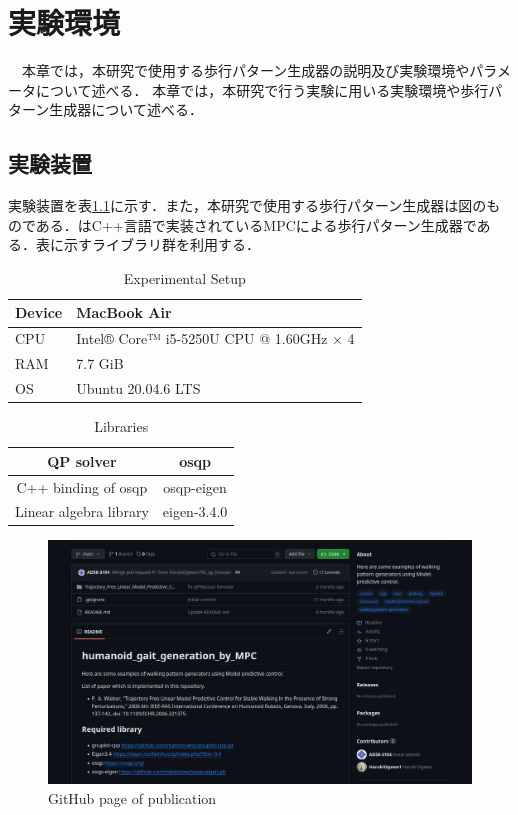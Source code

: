\chapter{実験環境}
　本章では，本研究で使用する歩行パターン生成器の説明及び実験環境やパラメータについて述べる．
本章では，本研究で行う実験に用いる実験環境や歩行パターン生成器について述べる．

\section{実験装置}
実験装置を表\ref{tab:Experimental Setup}に示す．また，本研究で使用する歩行パターン生成器は図のものである．はC++言語で実装されているMPCによる歩行パターン生成器である．表に示すライブラリ群を利用する．
\begin{table}[H]
  \centering
  \caption{Experimental Setup}
  \label{tab:Experimental Setup}
  \begin{tabular}{|l|l|}
      \hline \hline
       Device    & MacBook Air \\ \hline
       CPU       & Intel® Core™ i5-5250U CPU @ 1.60GHz × 4 \\ \hline
       RAM       & 7.7 GiB \\ \hline
       OS        & Ubuntu 20.04.6 LTS \\ \hline
  \end{tabular}
\end{table}

\begin{table}[H]
  \centering
  \caption{Libraries}
  \label{tab:Libraries}
  \begin{tabular}{|c|c|}
       \hline \hline
       QP solver                & osqp                  \\ \hline
       C++ binding of osqp      & osqp-eigen            \\ \hline
       Linear algebra library   & eigen-3.4.0           \\ \hline
  \end{tabular}
\end{table}

\begin{figure}[H]
  \centering
 \includegraphics[keepaspectratio, scale=0.3]
      {images/github.png}
 \caption{GitHub page of publication}
 \label{Fig:GitHub page of publication}
\end{figure}


